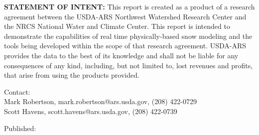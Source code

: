 \documentclass[11pt, oneside]{article}   	%
\begin{document}
\vspace{1cm}

\noindent\textbf{STATEMENT OF INTENT:} This report is created as a product of a research agreement between the USDA-ARS Northwest Watershed Research Center and the NRCS National Water and Climate Center. This report is intended to demonstrate the capabilities of real time physically-based snow modeling and the tools being developed within the scope of that research agreement. USDA-ARS provides the data to the best of its knowledge and shall not be liable for any consequences of any kind, including, but not limited to, lost revenues and profits, that arise from using the products provided.

\vspace{0.5cm} 
\noindent
Contact: \\
\hspace{2cm} Mark Robertson, mark.robertson@ars.usda.gov, (208) 422-0729 \\
\hspace{2cm} Scott Havens, scott.havens@ars.usda.gov, (208) 422-0739 

\par\vspace*{\fill}
\noindent
\footnotesize{
	Published: 
}
\end{document}
